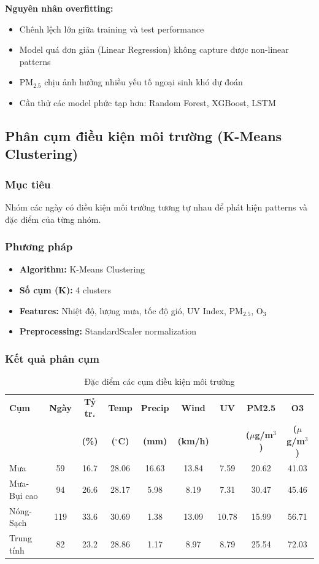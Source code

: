 \documentclass[12pt,a4paper]{article}
\newcommand{\ugm}{$\mu$g/m$^3$}
\newcommand{\degreec}{$^\circ$C}
\newcommand{\ozone}{O$_3$}
\newcommand{\pmtwofive}{PM$_{2.5}$}
\begin{document}
\textbf{Nguyên nhân overfitting:}
\begin{itemize}
    \item Chênh lệch lớn giữa training và test performance
    \item Model quá đơn giản (Linear Regression) không capture được non-linear patterns
    \item \pmtwofive{} chịu ảnh hưởng nhiều yếu tố ngoại sinh khó dự đoán
    \item Cần thử các model phức tạp hơn: Random Forest, XGBoost, LSTM
\end{itemize}

\subsection{Phân cụm điều kiện môi trường (K-Means Clustering)}

\subsubsection{Mục tiêu}
Nhóm các ngày có điều kiện môi trường tương tự nhau để phát hiện patterns và đặc điểm của từng nhóm.

\subsubsection{Phương pháp}
\begin{itemize}
    \item \textbf{Algorithm:} K-Means Clustering
    \item \textbf{Số cụm (K):} 4 clusters
    \item \textbf{Features:} Nhiệt độ, lượng mưa, tốc độ gió, UV Index, \pmtwofive{}, \ozone{}
    \item \textbf{Preprocessing:} StandardScaler normalization
\end{itemize}

\subsubsection{Kết quả phân cụm}

\begin{table}[H]
\centering
\caption{Đặc điểm các cụm điều kiện môi trường}
\label{tab:clustering}
\small
\begin{tabular}{lcccccccc}
\toprule
\textbf{Cụm} & \textbf{Ngày} & \textbf{Tỷ tr.} & \textbf{Temp} & \textbf{Precip} & \textbf{Wind} & \textbf{UV} & \textbf{PM2.5} & \textbf{O3} \\
 & & \textbf{(\%)} & \textbf{(\degreec{})} & \textbf{(mm)} & \textbf{(km/h)} & & \textbf{(\ugm{})} & \textbf{(\ugm{})} \\
\midrule
Mưa & 59 & 16.7 & 28.06 & 16.63 & 13.84 & 7.59 & 20.62 & 41.03 \\
Mưa-Bụi cao & 94 & 26.6 & 28.17 & 5.98 & 8.19 & 7.31 & 30.47 & 45.46 \\
Nóng-Sạch & 119 & 33.6 & 30.69 & 1.38 & 13.09 & 10.78 & 15.99 & 56.71 \\
Trung tính & 82 & 23.2 & 28.86 & 1.17 & 8.97 & 8.79 & 25.54 & 72.03 \\
\bottomrule
\end{tabular}
\end{table}
\end{document}
